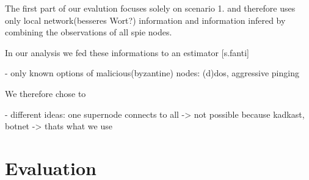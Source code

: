The first part of our evalution focuses solely on scenario 1. and therefore uses only local
network(besseres Wort?) information and information infered by combining the observations of all spie nodes.


In our analysis we fed these informations to an estimator [s.fanti]

- only known options of malicious(byzantine) nodes: (d)dos, aggressive pinging

We therefore chose to 

- different ideas: one supernode connects to all -> not possible because kadkast, botnet -> thats what we use

\section{Evaluation}